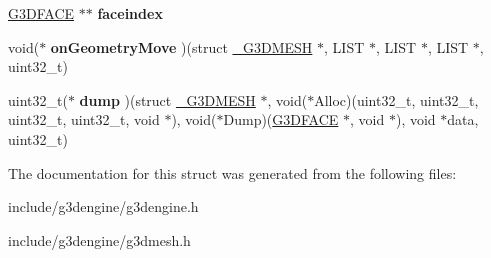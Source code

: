 \begin{DoxyCompactItemize}
\hyperlink{struct__G3DFACE}{G3\+D\+F\+A\+CE} $\ast$$\ast$ {\bfseries faceindex}
\item 
\mbox{\label{struct__G3DMESH_aef6762aab3886be811c85d523022fed9}} 
void($\ast$ {\bfseries on\+Geometry\+Move} )(struct \hyperlink{struct__G3DMESH}{\+\_\+\+G3\+D\+M\+E\+SH} $\ast$, L\+I\+ST $\ast$, L\+I\+ST $\ast$, L\+I\+ST $\ast$, uint32\+\_\+t)
\item 
\mbox{\label{struct__G3DMESH_ae3d29f8cc9ee25672e675ac242dde9b6}} 
uint32\+\_\+t($\ast$ {\bfseries dump} )(struct \hyperlink{struct__G3DMESH}{\+\_\+\+G3\+D\+M\+E\+SH} $\ast$, void($\ast$Alloc)(uint32\+\_\+t, uint32\+\_\+t, uint32\+\_\+t, uint32\+\_\+t, void $\ast$), void($\ast$Dump)(\hyperlink{struct__G3DFACE}{G3\+D\+F\+A\+CE} $\ast$, void $\ast$), void $\ast$data, uint32\+\_\+t)
\end{DoxyCompactItemize}


The documentation for this struct was generated from the following files\+:\begin{DoxyCompactItemize}
\item 
include/g3dengine/g3dengine.\+h\item 
include/g3dengine/g3dmesh.\+h\end{DoxyCompactItemize}
